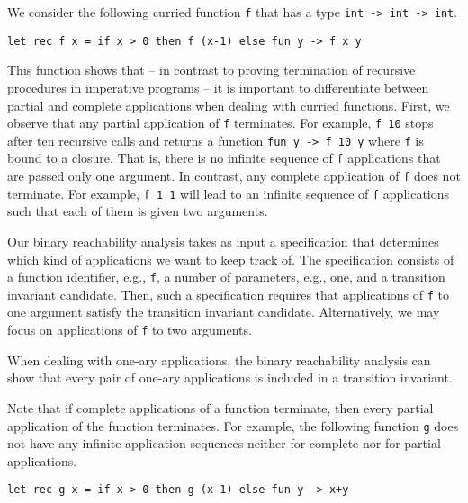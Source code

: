 We consider the following curried function \texttt{f} that has a type 
\texttt{int -> int -> int}.
%
\begin{center}
\begin{minipage}[h]{.8\linewidth}
\begin{small}
\begin{verbatim}
let rec f x = if x > 0 then f (x-1) else fun y -> f x y
\end{verbatim}
\end{small}
\end{minipage}
\end{center}
%
This function shows that -- in contrast to proving termination of
recursive procedures in imperative programs -- it is important to
differentiate between partial and complete applications when dealing
with curried functions.
First, we observe that any partial application of \texttt{f}
terminates.
For example, \texttt{f 10} stops after ten recursive calls and returns
a function \texttt{fun y -> f 10 y} where \texttt{f} is bound to a
closure.
That is, there is no infinite sequence of \texttt{f} applications that
are passed only one argument.
In contrast, any complete application of \texttt{f} does not terminate.
For example, \texttt{f 1 1} will lead to an infinite sequence of
\texttt{f} applications such that each of them is given two arguments.

Our binary reachability analysis takes as input a specification that
determines which kind of applications we want to keep track of. 
The specification consists of a function identifier, e.g., \texttt{f},
a number of parameters, e.g., one, and a transition invariant candidate. 
Then, such a specification requires that applications of \texttt{f} to
one argument satisfy the transition invariant candidate.
Alternatively, we may focus on applications of \texttt{f} to two
arguments.

When dealing with one-ary applications, the binary reachability
analysis can show that every pair of one-ary applications is included
in a transition invariant. 


Note that if complete applications of a function terminate, then every
partial application of the function terminates.
For example, the following function \texttt{g} does not have any
infinite application sequences neither for complete nor for partial
applications.
%
\begin{center}
\begin{minipage}[h]{.8\linewidth}
\begin{small}
\begin{verbatim}
let rec g x = if x > 0 then g (x-1) else fun y -> x+y
\end{verbatim}
\end{small}
\end{minipage}
\end{center}




